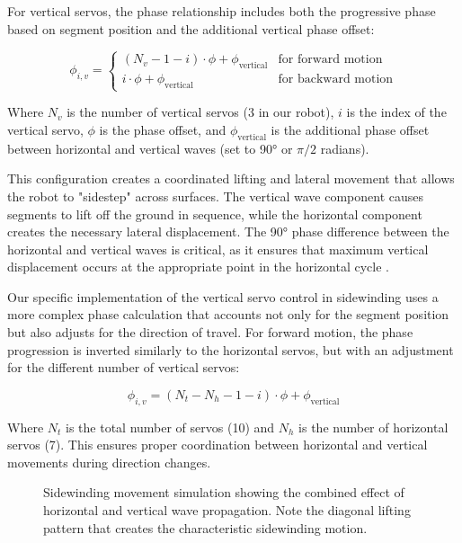 \documentclass[12pt,a4paper]{report}
\begin{document}
For vertical servos, the phase relationship includes both the progressive phase based on segment position and the additional vertical phase offset:

\begin{equation}
\phi_{i,v} = 
\begin{cases}
(N_v - 1 - i) \cdot \phi + \phi_{\text{vertical}} & \text{for forward motion} \\
i \cdot \phi + \phi_{\text{vertical}} & \text{for backward motion}
\end{cases}
\end{equation}

Where $N_v$ is the number of vertical servos (3 in our robot), $i$ is the index of the vertical servo, $\phi$ is the phase offset, and $\phi_{\text{vertical}}$ is the additional phase offset between horizontal and vertical waves (set to 90° or $\pi/2$ radians).

This configuration creates a coordinated lifting and lateral movement that allows the robot to "sidestep" across surfaces. The vertical wave component causes segments to lift off the ground in sequence, while the horizontal component creates the necessary lateral displacement. The 90° phase difference between the horizontal and vertical waves is critical, as it ensures that maximum vertical displacement occurs at the appropriate point in the horizontal cycle \parencite{yamano-2023}.

Our specific implementation of the vertical servo control in sidewinding uses a more complex phase calculation that accounts not only for the segment position but also adjusts for the direction of travel. For forward motion, the phase progression is inverted similarly to the horizontal servos, but with an adjustment for the different number of vertical servos:

\begin{equation}
\phi_{i,v} = (N_t - N_h - 1 - i) \cdot \phi + \phi_{\text{vertical}}
\end{equation}

Where $N_t$ is the total number of servos (10) and $N_h$ is the number of horizontal servos (7). This ensures proper coordination between horizontal and vertical movements during direction changes.


\begin{figure}
  \centering
  \caption{Sidewinding movement simulation showing the combined effect of horizontal and vertical wave propagation. Note the diagonal lifting pattern that creates the characteristic sidewinding motion.}
  \label{fig:side-anim}
\end{figure}
\end{document}
